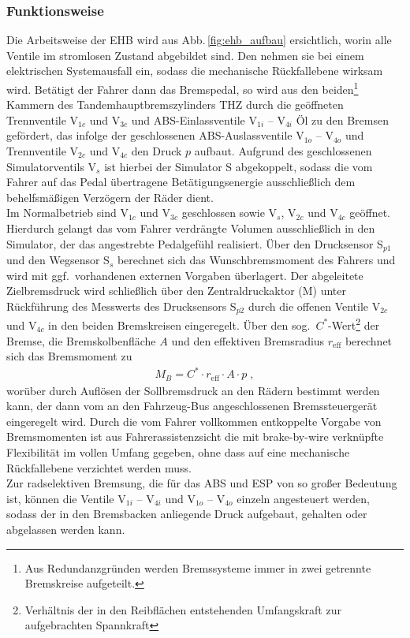 \subsubsection{Funktionsweise} \label{sec:ehb_funktionsweise}
Die Arbeitsweise der EHB wird aus Abb.\,\ref{fig:ehb_aufbau} ersichtlich, worin alle Ventile im stromlosen Zustand abgebildet sind. Den nehmen sie bei einem elektrischen Systemausfall ein, sodass die mechanische Rückfallebene wirksam wird. Betätigt der Fahrer dann das Bremspedal, so wird aus den beiden\footnote{Aus Redundanzgründen werden Bremssysteme immer in zwei getrennte Bremskreise aufgeteilt.} Kammern des Tandemhauptbremszylinders THZ durch die geöffneten Trennventile V$\!_{1c}$ und V$\!_{3c}$ und ABS-Einlassventile V$\!_{1i}$ -- V$_{4i}$ Öl zu den Bremsen gefördert, das infolge der geschlossenen ABS-Auslassventile V$\!_{1o}$ -- V$\!_{4o}$  und Trennventile V$\!_{2c}$ und V$\!_{4c}$ den Druck $p$ aufbaut. Aufgrund des geschlossenen Simulatorventils V$\!_s$ ist hierbei der Simulator S abgekoppelt, sodass die vom Fahrer auf das Pedal übertragene Betätigungsenergie ausschließlich dem behelfsmäßigen Verzögern der Räder dient. \\
Im Normalbetrieb sind V$\!_{1c}$ und V$\!_{3c}$ geschlossen sowie V$\!_s$, V$\!_{2c}$ und V$\!_{4c}$ geöffnet. Hierdurch gelangt das vom Fahrer verdrängte Volumen %
ausschließlich in den Simulator, der das angestrebte Pedalgefühl realisiert. Über den Drucksensor S$_{p1}$ und den Wegsensor S$_s$ berechnet sich das Wunschbremsmoment des Fahrers und wird mit ggf.\ vorhandenen externen Vorgaben überlagert. Der abgeleitete Zielbremsdruck wird schließlich über den Zentraldruckaktor (M) unter Rückführung des Messwerts des Drucksensors S$_{p2}$ durch die offenen Ventile V$\!_{2c}$ und V$\!_{4c}$ in den beiden Bremskreisen eingeregelt. 
Über den sog.\ $C^\ast$-Wert\footnote{Verhältnis der in den Reibflächen entstehenden Umfangskraft zur aufgebrachten Spannkraft} der Bremse, die Bremskolbenfläche $A$ und den effektiven Bremsradius $r_\text{eff}$ berechnet sich das Bremsmoment zu
\begin{align*}
	M_B = C^\ast \cdot r_\text{eff}\cdot A \cdot p\;,
\end{align*}
worüber durch Auflösen der Sollbremsdruck an den Rädern bestimmt werden kann, der dann vom an den Fahrzeug-Bus angeschlossenen Bremssteuergerät eingeregelt wird.
Durch die vom Fahrer vollkommen entkoppelte Vorgabe von Bremsmomenten ist aus Fahrerassistenzsicht die mit brake-by-wire verknüpfte Flexibilität im vollen Umfang gegeben, 
ohne dass auf eine mechanische Rückfallebene verzichtet werden muss. \\
Zur radselektiven Bremsung, die für das ABS und ESP von so großer Bedeutung ist, können die Ventile V$\!_{1i}$ -- V$_{4i}$ und V$\!_{1o}$ -- V$_{4o}$ einzeln angesteuert werden, sodass der in den Bremsbacken anliegende Druck aufgebaut, gehalten oder abgelassen werden kann.

